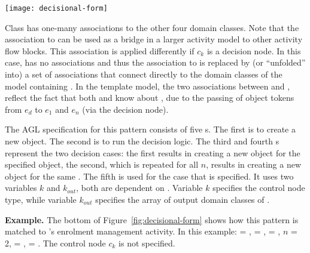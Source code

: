 {\begin{figure*}[ht]
\begin{center}
\texttt{[image: decisional-form]}
\end{center}
\vspace{-0.4cm}
\caption{The decisional pattern form.} %
\label{fig:decisional-form}
\end{figure*}

Class  has one-many associations to the other four domain classes. 
Note that the association to  can be used as a bridge in a larger activity model to other activity flow blocks. This association is applied differently if $ c_k $ is a decision node. In this case,  has no associations and thus the association to  is replaced by (or ``unfolded'' into) a set of associations that connect  directly to the domain classes of the model containing .
%
In the template model, the two associations between  and ,  reflect the fact that both  and  know about , due to the passing of object tokens from $ e_d $ to $ e_1 $ and $ e_n $ (via the decision node).

The AGL specification for this pattern consists of five s. The first  is to create a new  object. The second  is to run the decision logic. The third and fourth s represent the two decision cases: the first results in creating a new  object for the specified  object, the second, which is repeated for all $ n $, results in creating a new  object for the same . The fifth  is used for the case that  is specified. It uses two variables $ k $ and $ k_{out} $, both are dependent on . Variable $ k $ specifies the control node type, while variable $ k_{out} $ specifies the array of output domain classes of .

\noindent\textbf{Example.} The bottom of Figure~\ref{fig:decisional-form} shows how this pattern is matched to \courseman's enrolment management activity. %
In this example:  = ,  = ,  = , $ n $ = 2,  = ,  = .
The control node $ c_k $ is not specified.

}
